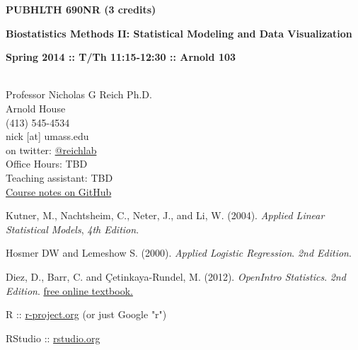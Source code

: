 \documentclass[10pt]{article}
\begin{document}
\centerline{\bf \large PUBHLTH 690NR (3 credits)} 
\centerline{\bf \large Biostatistics Methods II: Statistical Modeling and Data Visualization}
\centerline{\bf Spring 2014 :: T/Th 11:15-12:30  :: Arnold 103 }

\vspace{.25in}
\\
\noindent Professor Nicholas G Reich Ph.D. \\
 Arnold House \\
\noindent (413) 545-4534 \\
\noindent nick [at] umass.edu \\
\noindent on twitter: \href{https://twitter.com/reichlab}{@reichlab}\\
\noindent Office Hours: TBD \\
\noindent Teaching assistant: TBD \\
\noindent \href{https://github.com/nickreich/methods2}{Course notes on GitHub}



\bigskip
{}


Kutner, M., Nachtsheim, C., Neter, J., and Li, W. (2004). \emph{Applied Linear Statistical Models}, \emph{4th Edition}. %
  

Hosmer DW and Lemeshow S. (2000). \emph{Applied Logistic Regression}. \emph{2nd Edition}. %

Diez, D., Barr, C. and \c{C}etinkaya-Rundel, M. (2012). \emph{OpenIntro Statistics}. \emph{2nd Edition}. \href{http://www.openintro.org/stat/index.php}{free online textbook.}



R :: \href{http://www.r-project.org}{r-project.org} (or just Google "r")

RStudio :: \href{http://www.rstudio.org}{rstudio.org}
\end{document}
